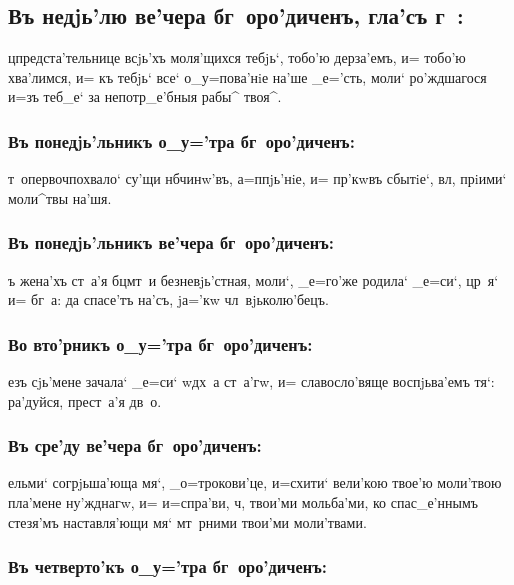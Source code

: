 \documentclass[14pt,twoside]{extreport}
\renewcommand{\*}{~~\raise3pt\hbox{\footnotesize*}}
\begin{document}
\delimpict

\subsection[Гла'съ г~]{Въ недjь'лю ве'чера бг~оро'диченъ, гла'съ г~:}

ц предста'тельнице всjь'хъ моля'щихся тебjь`, тобо'ю дерза'емъ, и=
тобо'ю хва'лимся, и= къ тебjь` все` о_у=пова'нiе на'ше _е='сть, моли`
ро'ждшагося и=зъ теб_е` за непотр_е'бныя рабы^ твоя^.

\subsubsection{Въ понедjь'льникъ о_у='тра бг~оро'диченъ:}

т~опервоч похвало` су'щи нб чинw'въ, а=п пjь'нiе,
и= пр'кwвъ сбытiе`, вл, прi\-и\-ми` моли^твы на'шя.

\subsubsection{Въ понедjь'льникъ ве'чера бг~оро'диченъ:}

ъ жена'хъ ст~а'я бц мт~и безневjь'стная, моли`, _е=го'же родила`
_е=си`, цр~я` и= бг~а: да спасе'тъ на'съ, jа='кw чл~вjьколю'бецъ.

\subsubsection{Во вто'рникъ о_у='тра бг~оро'диченъ:}

езъ сjь'мене зачала` _е=си` w\т дх~а ст~а'гw, и= славосло'вяще
воспjьва'емъ тя`: ра'дуйся, прест~а'я дв~о.

\subsubsection{Въ сре'ду ве'чера бг~оро'диченъ:}

ельми` согрjьша'юща мя`, _о=трокови'це, и=схити` вели'кою твое'ю
моли'твою пла'мене ну'жднагw, и= и=спра'ви, ч, твои'ми мольба'ми, ко
спас_е'ннымъ стезя'мъ наставля'ющи мя` мт~рними твои'ми моли'твами.

\subsubsection{Въ четверто'къ о_у='тра бг~оро'диченъ:}
\end{document}
